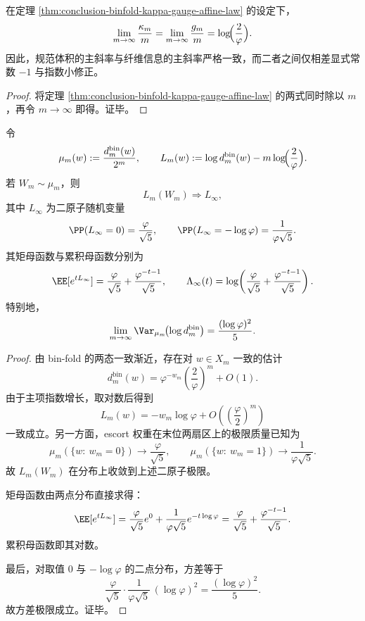 \begin{corollary}[规范体积与纤维信息的主斜率严格一致]\label{cor:conclusion-binfold-kappa-gauge-common-slope}
在定理 \ref{thm:conclusion-binfold-kappa-gauge-affine-law} 的设定下，
\[
\lim_{m\to\infty}\frac{\kappa_m}{m}
=
\lim_{m\to\infty}\frac{g_m}{m}
=
\log\!\Bigl(\frac{2}{\varphi}\Bigr).
\]
因此，规范体积的主斜率与纤维信息的主斜率严格一致，而二者之间仅相差显式常数 \(-1\) 与指数小修正。
\end{corollary}
\begin{proof}
将定理 \ref{thm:conclusion-binfold-kappa-gauge-affine-law} 的两式同时除以 \(m\)，再令 \(m\to\infty\) 即得。证毕。
\end{proof}

\begin{theorem}[对数纤维规模的二原子极限律]\label{thm:conclusion-binfold-logfiber-two-atom-limit}
令
\[
\mu_m(w):=\frac{d_m^{\mathrm{bin}}(w)}{2^m},
\qquad
L_m(w):=\log d_m^{\mathrm{bin}}(w)-m\log\!\Bigl(\frac{2}{\varphi}\Bigr).
\]
若 \(W_m\sim \mu_m\)，则
\[
L_m(W_m)\Longrightarrow L_\infty,
\]
其中 \(L_\infty\) 为二原子随机变量
\[
\PP(L_\infty=0)=\frac{\varphi}{\sqrt5},
\qquad
\PP(L_\infty=-\log\varphi)=\frac{1}{\varphi\sqrt5}.
\]
其矩母函数与累积母函数分别为
\[
\EE[e^{tL_\infty}]
=
\frac{\varphi}{\sqrt5}+\frac{\varphi^{-t-1}}{\sqrt5},
\qquad
\Lambda_\infty(t)
=
\log\!\left(\frac{\varphi}{\sqrt5}+\frac{\varphi^{-t-1}}{\sqrt5}\right).
\]
特别地，
\[
\lim_{m\to\infty}\Var_{\mu_m}\!\bigl(\log d_m^{\mathrm{bin}}\bigr)
=
\frac{(\log\varphi)^2}{5}.
\]
\end{theorem}
\begin{proof}
由 bin-fold 的两态一致渐近，存在对 \(w\in X_m\) 一致的估计
\[
d_m^{\mathrm{bin}}(w)
=
\varphi^{-w_m}\left(\frac{2}{\varphi}\right)^m+O(1).
\]
由于主项指数增长，取对数后得到
\[
L_m(w)
=
-w_m\log\varphi+O\!\left(\left(\frac{\varphi}{2}\right)^m\right)
\]
一致成立。另一方面，escort 权重在末位两扇区上的极限质量已知为
\[
\mu_m(\{w:\ w_m=0\})\to \frac{\varphi}{\sqrt5},
\qquad
\mu_m(\{w:\ w_m=1\})\to \frac{1}{\varphi\sqrt5}.
\]
故 \(L_m(W_m)\) 在分布上收敛到上述二原子极限。

矩母函数由两点分布直接求得：
\[
\EE[e^{tL_\infty}]
=
\frac{\varphi}{\sqrt5}e^{0}
+\frac{1}{\varphi\sqrt5}e^{-t\log\varphi}
=
\frac{\varphi}{\sqrt5}+\frac{\varphi^{-t-1}}{\sqrt5}.
\]
累积母函数即其对数。

最后，对取值 \(0\) 与 \(-\log\varphi\) 的二点分布，方差等于
\[
\frac{\varphi}{\sqrt5}\cdot \frac{1}{\varphi\sqrt5}\,(\log\varphi)^2
=
\frac{(\log\varphi)^2}{5}.
\]
故方差极限成立。证毕。
\end{proof}

